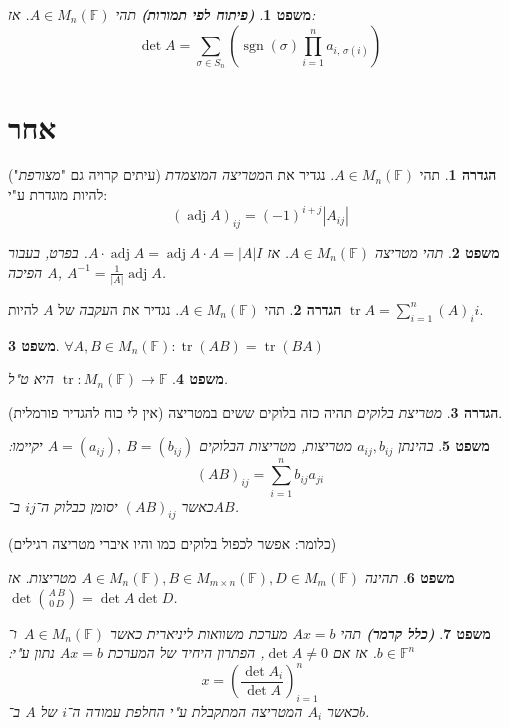 \documentclass[]{article}
\DeclareMathOperator{\sgn}    {sgn}
\DeclareMathOperator{\adj}    {adj}
\DeclareMathOperator{\tr}     {tr}
\newcommand\F         {\mathbb{F}}
\newcommand\co        {\colon}
\newcommand\mat[2]    {M_{#1\times#2}}
\newcommand\gmat      {\mat{m}{n}(\F)}
\newcommand\sg        {\sigma}
\newcommand\op    {^{-1}}
\newcommand\cl [1]    {\left ( #1 \right )}
\newtheorem{Theorem}{משפט}
\theoremstyle{definition}
\newtheorem{definition}{הגדרה}
\newcommand\theo  [1] {\begin{Theorem}#1\end{Theorem}}
\newcommand\defi  [1] {\begin{definition}#1\end{definition}}
\begin{document}
\begin{multicols}{2}
		\begin{Theorem}\textit{\textbf{(פיתוח לפי תמורות)}}
			תהי $A \in M_n(\F)$. אז: 
			\[ \det A = \sum_{\sg \in S_n} \cl{\sgn(\sg) \prod_{i = 1}^{n} a_{i,\,\sg(i)}} \]
		\end{Theorem}
		
		
		\section{אחר}
		\defi{תהי $A \in M_n(\F)$. נגדיר את ה\textit{מטריצה המוצמדת} (עיתים קרויה גם "\textit{מצורפת}") להיות מוגדרת ע"י: 
		\[ (\adj A)_{ij} = (-1)^{i + j}|A_{ij}| \]}
		\theo{תהי מטריצה $A \in M_n(\F)$. אז $A \cdot \adj A = \adj A \cdot A = |A| I$. בפרט, בעבור $A$ הפיכה, $A\op = \frac{1}{|A|} \adj A$. }
		
		\defi{תהי $A \in M_n(\F)$. נגדיר את ה\textit{עקבה} של $A$ להיות $\tr A = \sum_{i = 1}^{n} (A)_ii$. }
		\theo{\hfil $\forall A, B \in M_n(\F) \co \tr(AB) = \tr(BA)$}
		\theo{$\tr \co M_n(\F) \to \F$ היא ט"ל. }
		
		\defi{\textit{מטריצת בלוקים} תהיה כזה בלוקים ששים במטריצה (אין לי כוח להגדיר פורמלית). }
		\theo{בהינתן $a_{ij}, b_{ij}$ מטריצות, מטריצות הבלוקים $A = (a_{ij}), \ B = (b_{ij})$ יקיימו: 
		\[ (AB)_{ij} = \sum_{i = 1}^{n} b_{ij}a_{ji} \]
		כאשר $(AB)_{ij}$ יסומן כבלוק ה־$ij$ ב־$AB$. 
		}
		(כלומר: אפשר לכפול בלוקים כמו והיו איברי מטריצה רגילים)
		\theo{תהינה $A \in M_n(\F), B \in \gmat, D \in M_m(\F)$ מטריצות. אז $\det \binom{A \, B}{0\, D} = \det A \det D$. }
		
		\begin{Theorem}\textit{\textbf{(כלל קרמר)}}
			תהי $Ax = b$ מערכת משוואות ליניארית כאשר $A \in M_n(\F)$\ ו־$b \in \F^n$. אז אם $\det A \neq 0$, הפתרון היחיד של המערכת $Ax = b$ נתון ע"י: 
			\[ x = \cl{\frac{\det A_i}{\det A}}_{i = 1}^{n} \]
			כאשר $A_i$ המטריצה המתקבלת ע"י החלפת עמודה ה־$i$ של $A$ ב־$b$. 
		\end{Theorem}
		
		
		
	\end{multicols}
	{\let\newpage\relax\maketitle}
	\maketitle
	
\end{document}
